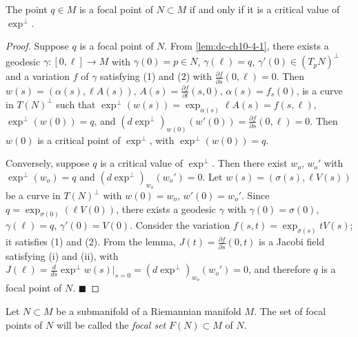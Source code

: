 \begin{proposition}[Proposition 4.4]
  \label{prop:dc-ch10-4-4}
  The point $q\in M$ is a focal point of $N\subset M$ if and only if it is a
  critical value of $\exp^\perp$.
\end{proposition}
\begin{proof}
  Suppose $q$ is a focal point of $N$. From \cref{lem:dc-ch10-4-1}, there exists a
  geodesic $\gamma:[0,\ell]\to M$ with $\gamma(0)=p\in N$, $\gamma(\ell)=q$,
  $\gamma'(0)\in(T_pN)^\perp$ and a variation $f$ of $\gamma$ satisfying (1) and (2)
  with $\frac{\partial f}{\partial s}(0,\ell)=0$. Then
  $w(s)=(\alpha(s),\ell A(s))$, $A(s)=\frac{\partial f}{\partial t}(s,0)$,
  $\alpha(s)=f_s(0)$, is a curve in $T(N)^\perp$ such that
  $\exp^\perp(w(s))=\exp_{\alpha(s)}\ell A(s)=f(s,\ell)$, $\exp^\perp(w(0))=q$, and
  $(d\exp^\perp)_{w(0)}(w'(0))=\frac{\partial f}{\partial s}(0,\ell)=0$. Then $w(0)$
  is a critical point of $\exp^\perp$, with $\exp^\perp(w(0))=q$.
  
  Conversely, suppose $q$ is a critical value of $\exp^\perp$. Then there exist
  $w_o$, $w_o'$ with $\exp^\perp(w_o)=q$ and $(d\exp^\perp)_{w_o}(w_o')=0$. Let
  $w(s)=(\sigma(s),\ell V(s))$ be a curve in $T(N)^\perp$ with $w(0)=w_o$,
  $w'(0)=w_o'$. Since $q=\exp_{\sigma(0)}(\ell V(0))$, there exists a geodesic
  $\gamma$ with $\gamma(0)=\sigma(0)$, $\gamma(\ell)=q$, $\gamma'(0)=V(0)$. Consider
  the variation $f(s,t)=\exp_{\sigma(s)}tV(s)$; it satisfies (1) and (2). From the
  lemma, $J(t)=\frac{\partial f}{\partial s}(0,t)$ is a Jacobi field satisfying (i)
  and (ii), with $J(\ell)=\frac{d}{ds}\exp^\perp w(s)|_{s=0}=(d\exp^\perp)_{w_o}(w_o')=0$,
  and therefore $q$ is a focal point of $N$. $\blacksquare$
\end{proof}

\begin{definition}
  \label{def:dc-ch10-4-5}
  Let $N\subset M$ be a submanifold of a Riemannian manifold $M$. The set of focal
  points of $N$ will be called the \emph{focal set} $F(N)\subset M$ of $N$.
\end{definition}

